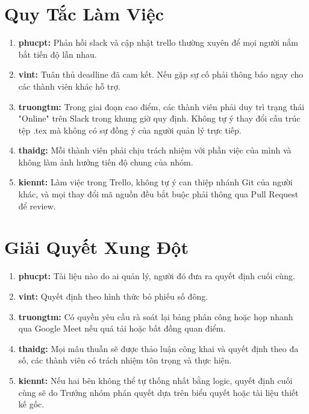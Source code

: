 \documentclass[12pt,a4paper]{article}
\begin{document}
\section{Quy Tắc Làm Việc}
\begin{enumerate}[itemsep=0pt, parsep=0pt]
    \item \textbf{phucpt:} Phản hồi slack và cập nhật trello thường xuyên để mọi người nắm bắt tiến độ lẫn nhau.
    \item \textbf{vint:} Tuân thủ deadline đã cam kết. Nếu gặp sự cố phải thông báo ngay cho các thành viên khác hỗ trợ.
    \item \textbf{truongtm:} Trong giai đoạn cao điểm, các thành viên phải duy trì trạng thái "Online" trên Slack trong khung giờ quy định. Không tự ý thay đổi cấu trúc tệp .tex mà không có sự đồng ý của người quản lý trực tiếp.
    \item \textbf{thaidg:} Mỗi thành viên phải chịu trách nhiệm với phần việc của mình và không làm ảnh hưởng tiến độ chung của nhóm.
    \item \textbf{kiennt:} Làm việc trong Trello, không tự ý can thiệp nhánh Git của người khác, và mọi thay đổi mã nguồn đều bắt buộc phải thông qua Pull Request để review.
\end{enumerate}

\section{Giải Quyết Xung Đột}
\begin{enumerate}[itemsep=0pt, parsep=0pt]
    \item \textbf{phucpt:} Tài liệu nào do ai quản lý, người đó đưa ra quyết định cuối cùng.
    \item \textbf{vint:} Quyết định theo hình thức bỏ phiếu số đông.
    \item \textbf{truongtm:} Có quyền yêu cầu rà soát lại bảng phân công hoặc họp nhanh qua Google Meet nếu quá tải hoặc bất đồng quan điểm.
    \item \textbf{thaidg:} Mọi mâu thuẫn sẽ được thảo luận công khai và quyết định theo đa số, các thành viên có trách nhiệm tôn trọng và thực hiện.
    \item \textbf{kiennt:} Nếu hai bên không thể tự thống nhất bằng logic, quyết định cuối cùng sẽ do Trưởng nhóm phán quyết dựa trên biểu quyết hoặc tài liệu thiết kế gốc.
\end{enumerate}
\end{document}
